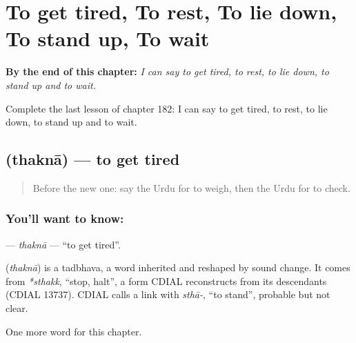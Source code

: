 
\chapter{To get tired, To rest, To lie down, To stand up, To wait}
\label{ch:ur-to-get-tired-to-rest-to-lie-down-to-stand-up-to-wait}

\begin{chapteropening}
\textbf{By the end of this chapter:} \emph{I can say to get tired, to rest, to lie down, to stand up and to wait.}

Complete the last lesson of chapter 182: I can say to get tired, to rest, to lie down, to stand up and to wait.
\end{chapteropening}

\section[\texorpdfstring{\ur{تھکنا} (thaknā)}{تھکنا (thaknā)}]{ (thaknā) — to get tired}

\label{lesson:UR-C182-thakna}



\begin{quote}
Before the new one: say the Urdu for to weigh, then the Urdu for to check.
\end{quote}

\subsection*{You'll want to know: }
\textbf{} — \emph{thaknā} — \textquotedblleft{}to get tired\textquotedblright{}.

\begin{cousinweb}
\textbf{} (\emph{thaknā}) is a tadbhava, a word inherited and reshaped by sound change. It comes from \emph{*sthakk}, \textquotedblleft{}stop, halt\textquotedblright{}, a form CDIAL reconstructs from its descendants (CDIAL 13737). CDIAL calls a link with \emph{sthā-}, \textquotedblleft{}to stand\textquotedblright{}, probable but not clear.
\end{cousinweb}

\begin{grammarlens}[title={What you've built}]
One more word for this chapter.
\end{grammarlens}

